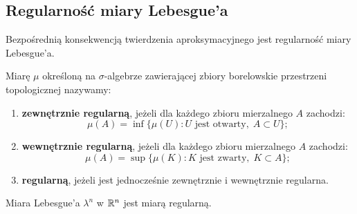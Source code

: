 \subsection{Regularność miary Lebesgue'a}

Bezpośrednią konsekwencją twierdzenia aproksymacyjnego jest regularność miary Lebesgue'a.

\begin{defi}
    Miarę $\mu$ określoną na $\sigma$-algebrze zawierającej zbiory borelowskie przestrzeni topologicznej nazywamy:
    \begin{enumerate}
        \item \textbf{zewnętrznie regularną}, jeżeli dla każdego zbioru mierzalnego $A$ zachodzi:
              \begin{equation*}
                  \mu(A) = \inf \{\mu(U) \colon U \text{ jest otwarty}, \; A \subset U\};
              \end{equation*}
        \item \textbf{wewnętrznie regularną}, jeżeli dla każdego zbioru mierzalnego $A$ zachodzi:
              \begin{equation*}
                  \mu(A) = \sup \{\mu(K) \colon K \text{ jest zwarty}, \; K \subset A\};
              \end{equation*}
        \item \textbf{regularną}, jeżeli jest jednocześnie zewnętrznie i wewnętrznie regularna.
    \end{enumerate}
\end{defi}

\begin{tw}
    Miara Lebesgue'a $\lambda^n$ w $\mathbb{R}^{n}$ jest miarą regularną.
\end{tw}

